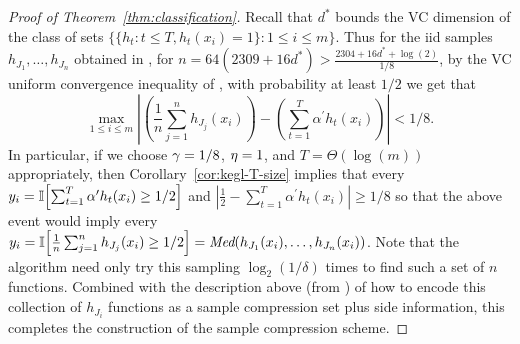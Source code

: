 \begin{proof}[Proof of Theorem~\ref{thm:classification}]
Recall that $d^{*}$ bounds the VC dimension of the class of sets $\{ \{ h_{t} : t \leq T, h_{t}(x_i) = 1 \} : 1 \leq i \leq m \}$.
Thus for the iid samples $h_{J_{1}},\ldots,h_{J_{n}}$ obtained in , 
for $n = 64(2309 + 16d^*) > \frac{2304 + 16d^*+\log(2)}{1/8}$, %
by the
VC
uniform convergence inequality of %
\citet{MR0288823}, 
with probability at least $1/2$ 
we get that
\begin{equation*}
  \max_{1 \leq i \leq m} \left| \left( \frac{1}{n} \sum_{j=1}^{n} h_{J_{j}}(x_i) \right)  - \left( \sum_{t=1}^{T} \alpha^{\prime} h_{t}(x_i) \right) \right| < 1/8.
\end{equation*}
In particular, if we choose $\gamma = 1/8$, $\eta = 1$, and $T = \Theta(\log(m))$ appropriately, 
then Corollary~\ref{cor:kegl-T-size} implies that 
every $y_i = \mathbb{I}\!\left[ \sum_{t=1}^{T} \alpha^{\prime} h_{t}(x_i) \geq 1/2 \right]$ 
and $\left| \frac{1}{2} - \sum_{t=1}^{T} \alpha^{\prime} h_{t}(x_i) \right| \geq 1/8$ 
so that the above event would imply 
every $y_i = \mathbb{I}\!\left[ \frac{1}{n} \sum_{j=1}^{n} h_{J_{j}}(x_i) \geq 1/2 \right] = \emph{Med}(h_{J_{1}}(x_i),\ldots,h_{J_{n}}(x_i))$.
Note that the  algorithm need only try this sampling $\log_{2}(1/\delta)$ times to find such a set of $n$ functions.
Combined with the description above (from \citealp{DBLP:journals/jacm/MoranY16}) 
of how to encode this collection of $h_{J_{i}}$ functions as a sample compression set plus side information, 
this completes the construction of the sample compression scheme.
\end{proof}




